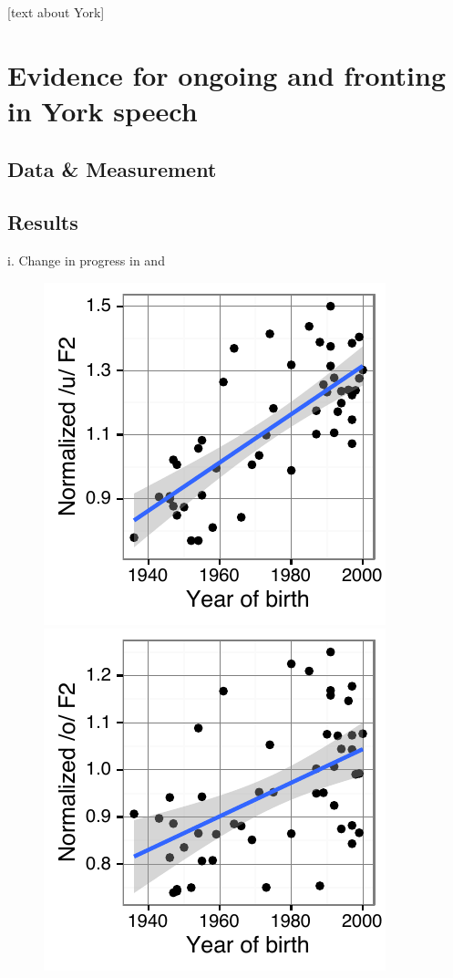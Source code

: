 \documentclass[PWPL]{article}
\begin{document}
[text about York]


\section{Evidence for ongoing  and  fronting in York speech}
\subsection{Data \& Measurement}
\subsection{Results}
i. Change in progress in  and \\

\begin{figure}[H]
\centering
\includegraphics{uw_yob_small.pdf}
\includegraphics{ow_yob_small.pdf}
\end{figure}
\end{document}

